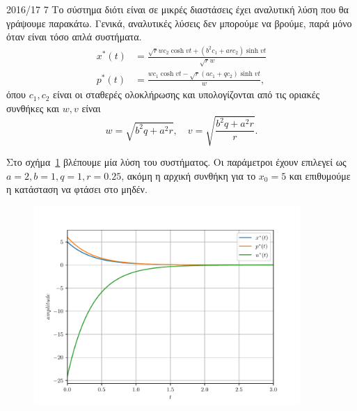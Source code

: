 \begin{solution}{2016/17 7}
    Το σύστημα διότι είναι σε μικρές διαστάσεις έχει αναλυτική λύση που θα
    γράψουμε παρακάτω. Γενικά, αναλυτικές λύσεις δεν μπορούμε να βρούμε, παρά
    μόνο όταν είναι τόσο απλά συστήματα.
    \begin{align*}
        x^*(t) &= \frac{
            \sqrt{r}wc_2\cosh{vt} + (b^2c_1 + arc_2)\sinh{vt}
        }{\sqrt{r}w} \\
        p^*(t) &= \frac{
            wc_1\cosh{vt} - \sqrt{r}(ac_1 + qc_2)\sinh{vt}
        }{w},
    \end{align*}
    όπου \( c_1, c_2 \) είναι οι σταθερές ολοκλήρωσης και υπολογίζονται από τις
    οριακές συνθήκες και \(w, v \) είναι
    \[
        w = \sqrt{b^2q + a^2r}, \quad v = \sqrt{\frac{b^2q + a^2r}{r}}.
    \]

    Στο σχήμα~\ref{fig:ex7_case1} βλέπουμε μία λύση του συστήματος. Οι
    παράμετροι έχουν επιλεγεί ως \( a = 2, b = 1, q = 1, r = 0.25 \), ακόμη η
    αρχική συνθήκη για το \( x_0 = 5 \) και επιθυμούμε η κατάσταση να φτάσει στο
    μηδέν.
    \begin{figure}[h]
        \centering
        \includegraphics[width=0.9\textwidth]{figures/ex7_case1.pdf}
        \caption{}
        \label{fig:ex7_case1}
    \end{figure}
\end{solution}
